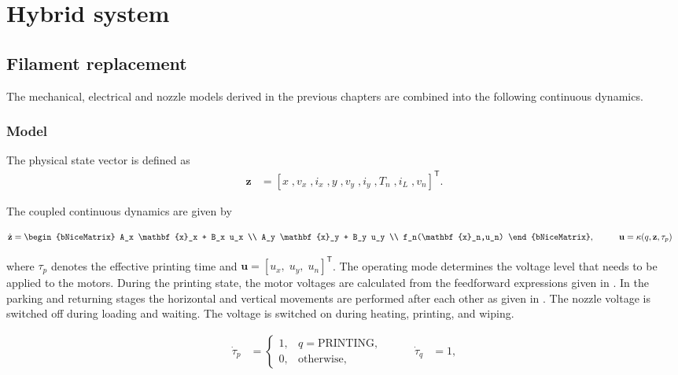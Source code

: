 \documentclass[a4paper,11pt]{article}
\begin{document}
\section{Hybrid system}

\subsection{Filament replacement}
The mechanical, electrical and nozzle models derived in the previous chapters are combined into the following continuous dynamics.

\subsubsection{Model}

The physical state vector is defined as
\begin{align}
    \mathbf{z} &= \left[x \;, v_x \;, i_x \;, y \;, v_y \;, i_y \;, T_n \;, i_L \;, v_n\right]^{\mathsf{T}}.
\end{align}

The coupled continuous dynamics are given by 

\begin{equation}
\begin{aligned}
    \dot{\mathbf{z}}
    &=
    \begin{bNiceMatrix}
        A_x \mathbf{x}_x + B_x u_x \\
        A_y \mathbf{x}_y + B_y u_y \\
        f_n(\mathbf{x}_n,u_n)
    \end{bNiceMatrix},
    &\qquad
    \mathbf{u}  &= \kappa(q,\mathbf{z},\tau_p)
\end{aligned}
\end{equation}

where $\tau_p$ denotes the effective printing time and $\mathbf{u}=\left[u_x, \; u_y, \; u_n\right]^{\mathsf{T}}$. The operating mode determines the voltage level that needs to be applied to the motors. During the printing state, the motor voltages are calculated from the feedforward expressions given in . In the parking and returning stages the horizontal and vertical movements are performed after each other as given in . The nozzle voltage is switched off during loading and waiting. The voltage is switched on during heating, printing, and wiping. 

\begin{equation}
\begin{aligned}
    \dot{\tau}_p
    &=
    \begin{cases}
		1, & q=\text{PRINTING},\\
        0, & \text{otherwise},
	\end{cases}
    &\qquad
    \dot{\tau}_q  &= 1,
\end{aligned}
\end{equation}
\end{document}
